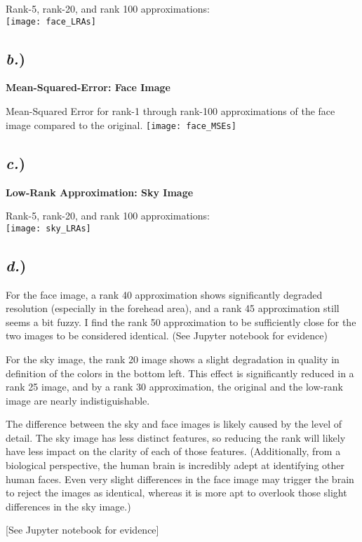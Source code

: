 \documentclass{report}
\begin{document}
Rank-5, rank-20, and rank 100 approximations:\\
\texttt{[image: face\_LRAs]}


\subsection*{\textit{b.})}
\textbf{Mean-Squared-Error: Face Image}

Mean-Squared Error for rank-1 through rank-100 approximations of the face image compared to the original.
\texttt{[image: face\_MSEs]}


\subsection*{\textit{c.})}
\textbf{Low-Rank Approximation: Sky Image}

Rank-5, rank-20, and rank 100 approximations:\\
\texttt{[image: sky\_LRAs]}


\subsection*{\textit{d.})}
For the face image, a rank 40 approximation shows significantly degraded resolution (especially in the forehead area), and a rank 45 approximation still seems a bit fuzzy. I find the rank 50 approximation to be sufficiently close for the two images to be considered identical. (See Jupyter notebook for evidence)

For the sky image, the rank 20 image shows a slight degradation in quality in definition of the colors in the bottom left. This effect is significantly reduced in a rank 25 image, and by a rank 30 approximation, the original and the low-rank image are nearly indistiguishable.

The difference between the sky and face images is likely caused by the level of detail. The sky image has less distinct features, so reducing the rank will likely have less impact on the clarity of each of those features. (Additionally, from a biological perspective, the human brain is incredibly adept at identifying other human faces. Even very slight differences in the face image may trigger the brain to reject the images as identical, whereas it is more apt to overlook those slight differences in the sky image.)

[See Jupyter notebook for evidence]
\end{document}
